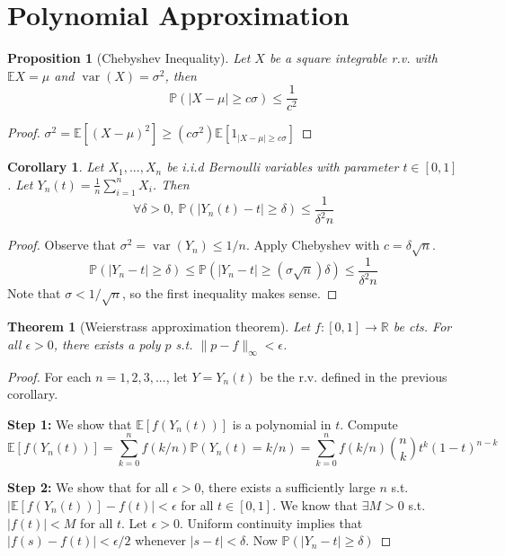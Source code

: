 \documentclass{article}
\theoremstyle{definition}
\theoremstyle{remark}
\theoremstyle{plain}
\newtheorem{thm}[defn]{Theorem}
\newtheorem{prop}[defn]{Proposition}
\newtheorem{crly}[defn]{Corollary}
\newcommand{\RR}{\mathbb{R}}
\newcommand{\PP}{\mathbb{P}}
\begin{document}
\section{Polynomial Approximation}
\begin{prop}[Chebyshev Inequality]
    Let $X$ be a square integrable r.v. with $\mathbb EX=\mu$ and $\operatorname{var}(X)=\sigma^2$, then
    \[\PP(|X-\mu|\ge c\sigma)\le\dfrac{1}{c^2}\]
\end{prop}
\begin{proof}
    $\sigma^2=\mathbb E[(X-\mu)^2]\ge (c\sigma^2)\mathbb E[1_{|X-\mu|\ge c\sigma}]$
\end{proof}
\begin{crly}
    Let $X_1,...,X_n$ be i.i.d Bernoulli variables with parameter $t\in[0,1]$. Let $Y_n(t)=\frac{1}{n}\sum_{i=1}^n X_i$. Then
    \[\forall \delta>0,\ \PP(|Y_n(t)-t|\ge\delta)\le\dfrac{1}{\delta^2n}\]
\end{crly}
\begin{proof}
    Observe that $\sigma^2=\operatorname{var}(Y_n)\le 1/n$. Apply Chebyshev with $c=\delta\sqrt n$.
    \[\PP(|Y_n-t|\ge \delta)\le \PP(|Y_n-t|\ge (\sigma\sqrt n)\delta)\le\dfrac{1}{\delta^2n}\]
    Note that $\sigma<1/\sqrt{n}$, so the first inequality makes sense.
\end{proof}
\begin{thm}[Weierstrass approximation theorem]
    Let $f:[0,1]\to\RR$ be cts. For all $\epsilon>0$, there exists a poly $p$ s.t. $\|p-f\|_\infty<\epsilon$.
\end{thm}
\begin{proof}
    For each $n=1,2,3,...$, let $Y=Y_n(t)$ be the r.v. defined in the previous corollary.

    \textbf{Step 1:} We show that $\mathbb E[f(Y_n(t))]$ is a polynomial in $t$. Compute
    \[\mathbb E[f(Y_n(t))]=\sum_{k=0}^n f(k/n)\PP(Y_n(t)=k/n)=\sum_{k=0}^nf(k/n)\binom{n}{k}t^k(1-t)^{n-k}\]

    \textbf{Step 2:} We show that for all $\epsilon>0$, there exists a sufficiently large $n$ s.t. $|\mathbb E[f(Y_n(t))]-f(t)|<\epsilon$ for all $t\in [0,1]$. We know that $\exists M>0$ s.t. $|f(t)|<M$ for all $t$. Let $\epsilon>0$. Uniform continuity implies that $|f(s)-f(t)|<\epsilon/2$ whenever $|s-t|<\delta$. Now $\PP(|Y_n-t|\ge\delta)$
\end{proof}
\end{document}
